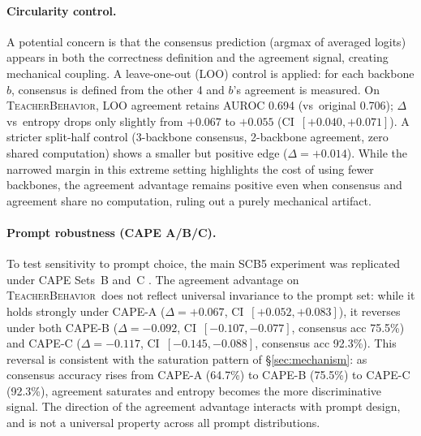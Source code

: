 \documentclass[a4paper,fleqn]{cas-sc}
\newcommand{\tb}{\textsc{TeacherBehavior}}
\newcommand{\scbfive}{\textsc{SCB5}}
\begin{document}
\paragraph{Circularity control.}
\label{sec:circularity}
A potential concern is that the consensus prediction (argmax of averaged logits) appears in both the correctness definition and the agreement signal, creating mechanical coupling.
A leave-one-out (LOO) control is applied: for each backbone $b$, consensus is defined from the other 4 and $b$'s agreement is measured.
On \tb, LOO agreement retains AUROC 0.694 (vs~original 0.706); $\Delta$ vs~entropy drops only slightly from $+0.067$ to $+0.055$ (CI~$[+0.040,+0.071]$).
A stricter split-half control (3-backbone consensus, 2-backbone agreement, zero shared computation) shows a smaller but positive edge ($\Delta = +0.014$).
While the narrowed margin in this extreme setting highlights the cost of using fewer backbones, the agreement advantage remains positive even when consensus and agreement share no computation, ruling out a purely mechanical artifact.

\paragraph{Prompt robustness (CAPE A/B/C).}
To test sensitivity to prompt choice, the main \scbfive{} experiment was replicated under CAPE Sets~B and~C \citep{cape_prompts}.
The agreement advantage on \tb\ does not reflect universal invariance to the prompt set: while it holds strongly under CAPE-A ($\Delta = +0.067$, CI~$[+0.052,+0.083]$), it reverses under both CAPE-B ($\Delta = -0.092$, CI~$[-0.107,-0.077]$, consensus acc 75.5\%) and CAPE-C ($\Delta = -0.117$, CI~$[-0.145,-0.088]$, consensus acc 92.3\%).
This reversal is consistent with the saturation pattern of \S\ref{sec:mechanism}: as consensus accuracy rises from CAPE-A (64.7\%) to CAPE-B (75.5\%) to CAPE-C (92.3\%), agreement saturates and entropy becomes the more discriminative signal.
The direction of the agreement advantage interacts with prompt design, and is not a universal property across all prompt distributions.
\end{document}
